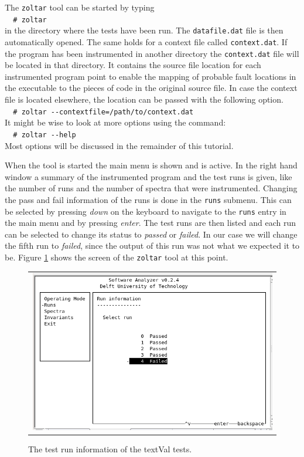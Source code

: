 	The \verb|zoltar| tool can be started by typing\\
	\verb|  # zoltar|\\
	in the directory where the tests have been run.
	The \verb|datafile.dat| file is then automatically opened.
	The same holds for a context file called \verb|context.dat|.
	If the program has been instrumented in another directory the
	\verb|context.dat| file will be located in that directory.
	It contains the source file location for each instrumented program point
	to enable the mapping of probable fault locations in the executable 
	to the pieces of code in the original source file.
	In case the context file is located elsewhere, 
	the location can be passed with the following option.\\
	\verb|  # zoltar --contextfile=/path/to/context.dat|\\
	It might be wise to look at more options using the command:\\
	\verb|  # zoltar --help|\\
	Most options will be discussed in the remainder of this tutorial.
	
	When the tool is started the main menu is shown and is active.
	In the right hand window a summary of the instrumented program and the test runs is given,
	like the number of runs and the number of spectra that were instrumented.
	Changing the pass and fail information of the runs is done in the \verb|runs| submenu.
	This can be selected by pressing \emph{down} on the keyboard to navigate to the \verb|runs|
	entry in the main menu and by pressing \emph{enter}.
	The test runs are then listed and each run can be selected to change its status to \emph{passed}
	or \emph{failed}.
	In our case we will change the fifth run to \emph{failed}, 
	since the output of this run was not what we expected it to be.
	Figure \ref{fig:analyzeRuns} shows the screen of the \verb|zoltar| tool at this point.
	
	\begin{figure}[h!]
		\begin{center}
		\begin{tabular}{c}
			\includegraphics[scale=0.40]{sources/analyze_runs.png} \\
		\end{tabular}
		\end{center}
		\caption{The test run information of the textVal tests.}
		\label{fig:analyzeRuns}
	\end{figure}

